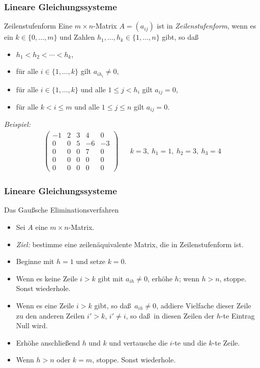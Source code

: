 \documentclass{beamer}
\renewcommand{\emph}[1]{{\textcolor{solarizedRed}{\itshape #1}}}
\renewcommand{\ae}{\"a}
\renewcommand{\oe}{\"o}
\newcommand{\ue}{\"u}
\newcommand{\mytitle}{Lineare Gleichungssysteme}
\begin{document}
\begin{frame}\frametitle{\mytitle}
	\begin{block}{Zeilenstufenform}
		Eine $m\times n$-Matrix $A=(a_{ij})$ ist in \emph{Zeilenstufenform}, wenn es ein $k\in\{0,\ldots,m\}$ und Zahlen $h_1,\ldots,h_k\in\{1,\ldots,n\}$ gibt, so da\ss
	\begin{itemize}
		\item $h_1<h_2<\cdots<h_k$,
		\item f\ue r alle $i\in\{1,\ldots,k\}$ gilt $a_{ih_i}\neq0$,
		\item f\ue r alle $i\in\{1,\ldots,k\}$ und alle $1\leq j<h_i$ gilt $a_{ij}=0$,
		\item f\ue r alle $k<i\leq m$ und alle $1\leq j\leq n$ gilt $a_{ij}=0$.
	\end{itemize}
	\emph{Beispiel:}
	\begin{align*}
	\begin{pmatrix}
		-1&2&3&4&0\\0&0&5&-6&-3\\0&0&0&7&0\\0&0&0&0&0\\0&0&0&0&0
	\end{pmatrix}&&
	k=3,\ h_1=1,\ h_2=3,\ h_3=4
	\end{align*}
	\end{block}
\end{frame}

\begin{frame}\frametitle{\mytitle}
	\begin{block}{Das Gau\ss sche Eliminationsverfahren}
	\begin{itemize}
	\item Sei $A$ eine $m\times n$-Matrix.
	\item \emph{Ziel:} bestimme eine zeilen\ae quivalente Matrix, die in Zeilenstufenform ist.
	\item Beginne mit $h=1$ und setze $k=0$.
	\item Wenn es keine Zeile $i>k$ gibt mit $a_{ih}\neq0$, erh\oe he $h$; wenn $h>n$, stoppe. Sonst wiederhole.
	\item Wenn es eine Zeile $i>k$ gibt, so da\ss\ $a_{ih}\neq0$, addiere Vielfache dieser Zeile zu den anderen Zeilen $i'>k$, $i'\neq i$, so da\ss\ in diesen Zeilen der $h$-te Eintrag Null wird.
	\item Erh\oe he anschlie\ss end $h$ und $k$ und vertausche die $i$-te und die $k$-te Zeile.
	\item Wenn $h>n$ oder $k=m$, stoppe. Sonst wiederhole.
	\end{itemize}
	\end{block}
\end{frame}
\end{document}
